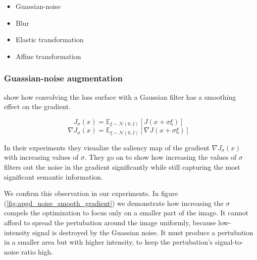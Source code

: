 \begin{itemize}
    \item Guassian-noise
    \item Blur
    \item Elastic transformation
    \item Affine transformation
\end{itemize}


\subsubsection{Guassian-noise augmentation}

\cite{Wu2020TowardsUA} show how convolving the loss surface with a Gaussian filter has a smoothing effect on the gradient.

$$J_{\sigma}(x) = \mathbb{E}_{\xi \sim \mathcal{N}(0, I)}[J(x + \sigma \xi)]$$
$$\nabla J_{\sigma}(x) = \mathbb{E}_{\xi \sim \mathcal{N}(0, I)}[\nabla J(x + \sigma \xi)]$$

In their experiments they visualize the saliency map of the gradient $\nabla J_{\sigma}(x)$ with increasing values of $\sigma$.
They go on to show how increasing the values of $\sigma$ filters out the noise in the gradient significantly while still capturing the most significant semantic information. 

We confirm this observation in our experiments. In figure (\ref{fig:apgd_noise_smooth_gradient}) we demonstrate how increasing the $\sigma$ compels the optimization to focus only on a smaller part of the image. It cannot afford to spread the pertubation around the image uniformly, because low-intensity signal is destroyed by the Guassian noise. It must produce a pertubation in a smaller area but with higher intensity, to keep the pertubation's signal-to-noise ratio high.


